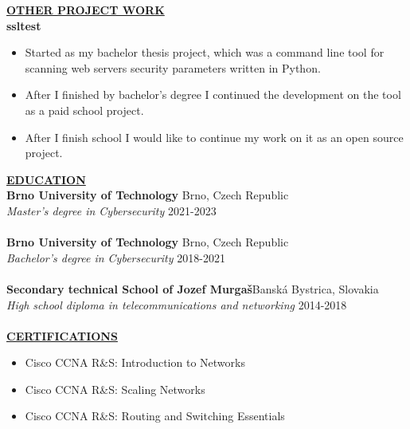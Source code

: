 \documentclass[11pt]{article}
\begin{document}
\noindent \textbf{\underline{OTHER PROJECT WORK}} \\
\noindent \textbf{ssltest}  
\begin{itemize}[noitemsep,nolistsep,leftmargin=*]
\item {Started as my bachelor thesis project, which was a command line tool for scanning web servers security parameters written in Python.}
\item {After I finished by bachelor's degree I continued the development on the tool as a paid school project.}
\item {After I finish school I would like to continue my work on it as an open source project.\\}
\end{itemize}


\noindent \textbf{\underline{EDUCATION}} \\
\textbf{Brno University of Technology} \hfill Brno, Czech Republic \\
\textit{Master's degree in Cybersecurity}  \hfill 2021-2023 \\ \\
\textbf{Brno University of Technology} \hfill Brno, Czech Republic \\
\textit{Bachelor's degree in Cybersecurity}  \hfill 2018-2021 \\ \\
\textbf{Secondary technical School of Jozef Murgaš}\hfill Banská Bystrica, Slovakia \\
\textit{High school diploma in telecommunications and networking}  \hfill 2014-2018 \\ \\



\noindent \textbf{\underline{CERTIFICATIONS}} 
\begin{itemize}[noitemsep,nolistsep,leftmargin=*]
\item {Cisco CCNA R\&S: Introduction to Networks}
\item {Cisco CCNA R\&S: Scaling Networks}
\item {Cisco CCNA R\&S: Routing and Switching Essentials\\}
\end{itemize}
\end{document}
